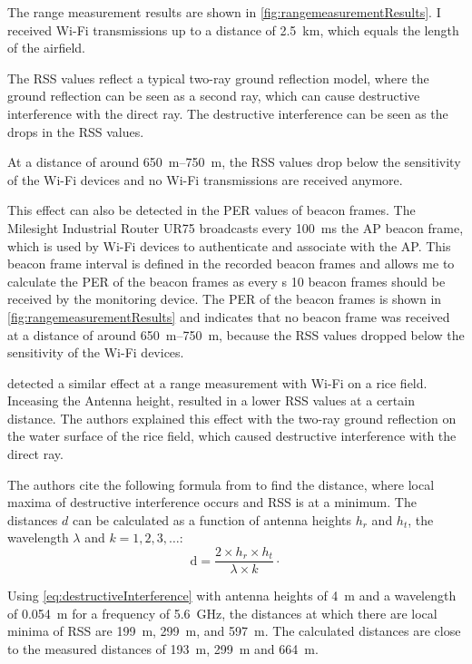 The range measurement results are shown in \autoref{fig:rangemeasurementResults}.
I received Wi-Fi transmissions up to a distance of \SI{2.5}{\kilo\metre},
which equals the length of the airfield.

The \ac{RSS} values reflect a typical two-ray ground reflection model, where the ground reflection can be seen as a second ray,
which can cause destructive interference with the direct ray.
The destructive interference can be seen as the drops in the \ac{RSS} values.

At a distance of around \SIrange{650}{750}{\metre}, the \ac{RSS} values drop below the sensitivity of the Wi-Fi devices and
no Wi-Fi transmissions are received anymore.

This effect can also be detected in the \ac{PER} values of beacon frames.
The Milesight Industrial Router UR75 broadcasts every \SI{100}{\milli\second} the \ac{AP} beacon frame, which is used by Wi-Fi devices to
authenticate and associate with the \ac{AP}.
This beacon frame interval is defined in the recorded beacon frames and allows me to
calculate the \ac{PER} of the beacon frames as every \si{\second} \num{10} beacon frames should be received by the monitoring device.
The \ac{PER} of the beacon frames is shown in \autoref{fig:rangemeasurementResults} and indicates that no beacon frame was received at
a distance of around \SIrange{650}{750}{\metre}, because the \ac{RSS} values dropped below the sensitivity of the Wi-Fi devices.

\textcite{brinkhoff_characterization_2017} detected a similar effect at a range measurement with Wi-Fi on a rice field.
Inceasing the Antenna height,
resulted in a lower \ac{RSS} values at a certain distance.
The authors explained this effect with the two-ray ground reflection on the water surface of the rice field,
which caused destructive interference with the direct ray.

The authors cite the following formula from \cite{rappaport_wireless_nodate} to find the distance, where local maxima
of destructive interference occurs and \ac{RSS} is at a minimum.
The distances $d$ can be calculated as a function of antenna heights
$h_r$ and $h_t$, the wavelength $\lambda$ and $k = 1, 2, 3, \dots$:
\begin{equation}\label{eq:destructiveInterference}
   \text{d} =
   \frac{
      2 \times h_r \times h_t
   }{
      \lambda \times k
   }
   \cdot
\end{equation}

Using \autoref{eq:destructiveInterference} with antenna heights of \SI{4}{\metre} and a wavelength of \SI{0.054}{\metre} for a frequency of \SI{5.6}{\giga\hertz},
the distances at which there are local minima of \ac{RSS} are \SI{199}{\metre}, \SI{299}{\metre}, and \SI{597}{\metre}.
The calculated distances are close to the measured distances of \SI{193}{\metre}, \SI{299}{\metre} and \SI{664}{\metre}.

